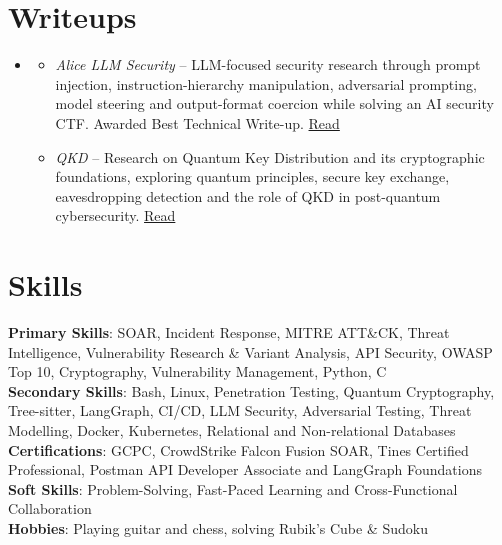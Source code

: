 \documentclass[a4paper,10pt]{article}
\newcommand{\link}[2]{\href{#1}{\color{blue}#2}}
\newcommand{\resumeItem}[1]{
  \item\small{
    {#1 \vspace{-2pt}}
  }
}
\newenvironment{resumeSubHeadingList}{\begin{itemize}[leftmargin=0.15in, label={}]}{\end{itemize}}
\newenvironment{resumeItemList}{\begin{itemize}}{\end{itemize}}
\begin{document}
\section{Writeups}
\begin{resumeSubHeadingList}
  \item[]
  \begin{resumeItemList}
    \resumeItem{\emph{Alice LLM Security} -- LLM-focused security research
                 through prompt injection, instruction-hierarchy manipulation,
                 adversarial prompting, model steering and output-format
                 coercion while solving an AI security CTF. Awarded Best
                 Technical Write-up.
                 \link{https://medium.com/engineering-activefence/alice-in-wonderland-prompt-based-ctf-ai-security-challenge-b6af4b6de75e}{Read}}
    \resumeItem{\emph{QKD} -- Research on Quantum Key Distribution and its
                 cryptographic foundations, exploring quantum principles, secure
                 key exchange, eavesdropping detection and the role of QKD in
                 post-quantum cybersecurity.
                 \link{https://medium.com/@suryaravi.in/qkd-quantum-key-distribution-cb1b954d52e8}{Read}}
  \end{resumeItemList}
\end{resumeSubHeadingList}

\section{Skills}
\begin{itemize}[leftmargin=0.15in, label={}]
  \small{\item{
        \textbf{Primary Skills}{: SOAR, Incident Response, MITRE ATT\&CK, Threat Intelligence, Vulnerability Research \& Variant Analysis, API Security, OWASP Top 10, Cryptography, Vulnerability Management, Python, C} \\
        \textbf{Secondary Skills}{: Bash, Linux, Penetration Testing, Quantum Cryptography, Tree-sitter, LangGraph, CI/CD, LLM Security, Adversarial Testing, Threat Modelling, Docker, Kubernetes, Relational and Non-relational Databases} \\
        \textbf{Certifications}{: GCPC, CrowdStrike Falcon Fusion SOAR, Tines Certified Professional, Postman API Developer Associate and LangGraph Foundations} \\
        \textbf{Soft Skills}{: Problem-Solving, Fast-Paced Learning and Cross-Functional Collaboration} \\
        \textbf{Hobbies}{: Playing guitar and chess, solving Rubik's Cube \& Sudoku}
        }}
\end{itemize}
\end{document}

